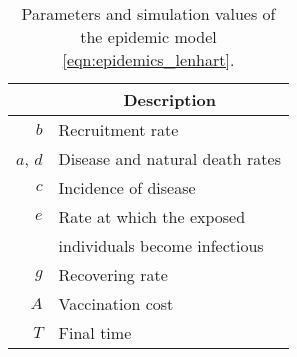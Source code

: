 \begin{table}[H]
  \begin{center}
    \begin{tabular}{rl}
      \toprule
        & \multicolumn{1}{c}{\textbf{Description}} 
        \\
      \midrule
        $b$
          & Recruitment rate
        \\
        $a$, $d$ 
          & Disease and natural death rates
        \\
        $c$
          & Incidence of disease
        \\
        $e$
          & Rate at which the exposed 
          \\
          & individuals become infectious
        \\
        $g$
          & Recovering rate
        \\
        $A$
          & Vaccination cost
        \\
        $T$
          & Final time
        \\
      \bottomrule
    \end{tabular}
    \caption{Parameters and simulation values of the epidemic model
      \eqref{eqn:epidemics_lenhart}.}
    \label{tbl:epidemics_lenhart_des}
  \end{center}
\end{table}
%
